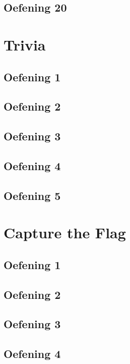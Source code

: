 \documentclass[a4paper,11pt]{report}
\begin{document}
\section{Oefening 20}

\newpage

\chapter{Trivia}
\section{Oefening 1}

\section{Oefening 2}

\section{Oefening 3}

\section{Oefening 4}

\section{Oefening 5}

\newpage

\chapter{Capture the Flag}
\section{Oefening 1}

\section{Oefening 2}

\section{Oefening 3}

\section{Oefening 4}

\newpage
\end{document}
